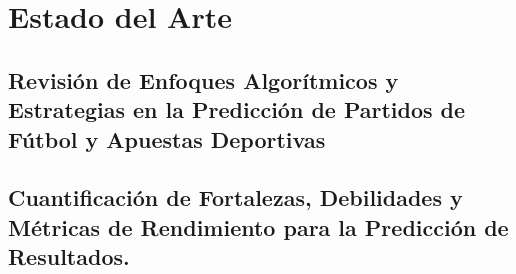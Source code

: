 \section{Estado del Arte}

\subsection{Revisión de Enfoques Algorítmicos y Estrategias en la Predicción de Partidos de Fútbol y Apuestas Deportivas}



\subsection{Cuantificación de Fortalezas, Debilidades y Métricas de Rendimiento para la Predicción de Resultados.}


